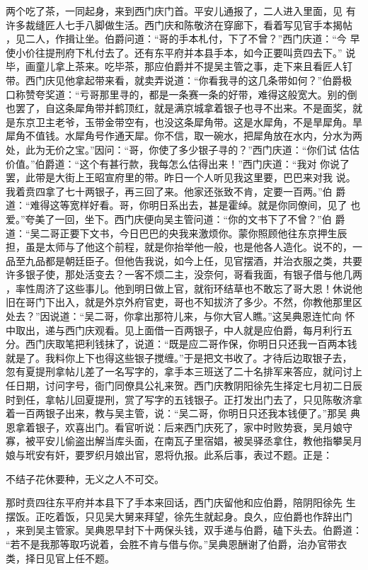 两个吃了茶，一同起身，来到西门庆门首。平安儿通报了，二人进入里面，见
有许多裁缝匠人七手八脚做生活。西门庆和陈敬济在穿廊下，看着写见官手本揭帖
，见二人，作揖让坐。伯爵问道：“哥的手本札付，下了不曾？”西门庆道：“今
早使小价往提刑府下札付去了。还有东平府并本县手本，如今正要叫贲四去下。”
说毕，画童儿拿上茶来。吃毕茶，那应伯爵并不提吴主管之事，走下来且看匠人钉
带。西门庆见他拿起带来看，就卖弄说道：“你看我寻的这几条带如何？”伯爵极
口称赞夸奖道：“亏哥那里寻的，都是一条赛一条的好带，难得这般宽大。别的倒
也罢了，自这条犀角带并鹤顶红，就是满京城拿着银子也寻不出来。不是面奖，就
是东京卫主老爷，玉带金带空有，也没这条犀角带。这是水犀角，不是旱犀角。旱
犀角不值钱。水犀角号作通天犀。你不信，取一碗水，把犀角放在水内，分水为两
处，此为无价之宝。”因问：“哥，你使了多少银子寻的？”西门庆道：“你们试
估估价值。”伯爵道：“这个有甚行款，我每怎么估得出来！”西门庆道：“我对
你说了罢，此带是大街上王昭宣府里的带。昨日一个人听见我这里要，巴巴来对我
说。我着贲四拿了七十两银子，再三回了来。他家还张致不肯，定要一百两。”伯
爵道：“难得这等宽样好看。哥，你明日系出去，甚是霍绰。就是你同僚间，见了
也爱。”夸美了一回，坐下。西门庆便向吴主管问道：“你的文书下了不曾？”伯
爵道：“吴二哥正要下文书，今日巴巴的央我来激烦你。蒙你照顾他往东京押生辰
担，虽是太师与了他这个前程，就是你抬举他一般，也是他各人造化。说不的，一
品至九品都是朝廷臣子。但他告我说，如今上任，见官摆酒，并治衣服之类，共要
许多银子使，那处活变去？一客不烦二主，没奈何，哥看我面，有银子借与他几两
，率性周济了这些事儿。他到明日做上官，就衔环结草也不敢忘了哥大恩！休说他
旧在哥门下出入，就是外京外府官吏，哥也不知拔济了多少。不然，你教他那里区
处去？”因说道：“吴二哥，你拿出那符儿来，与你大官人瞧。”这吴典恩连忙向
怀中取出，递与西门庆观看。见上面借一百两银子，中人就是应伯爵，每月利行五
分。西门庆取笔把利钱抹了，说道：“既是应二哥作保，你明日只还我一百两本钱
就是了。我料你上下也得这些银子搅缠。”于是把文书收了。才待后边取银子去，
忽有夏提刑拿帖儿差了一名写字的，拿手本三班送了二十名排军来答应，就问讨上
任日期，讨问字号，衙门同僚具公礼来贺。西门庆教阴阳徐先生择定七月初二日辰
时到任，拿帖儿回夏提刑，赏了写字的五钱银子。正打发出门去了，只见陈敬济拿
着一百两银子出来，教与吴主管，说：“吴二哥，你明日只还我本钱便了。”那吴
典恩拿着银子，欢喜出门。看官听说：后来西门庆死了，家中时败势衰，吴月娘守
寡，被平安儿偷盗出解当库头面，在南瓦子里宿娼，被吴驿丞拿住，教他指攀吴月
娘与玳安有奸，要罗织月娘出官，恩将仇报。此系后事，表过不题。正是：

不结子花休要种，无义之人不可交。

那时贲四往东平府并本县下了手本来回话，西门庆留他和应伯爵，陪阴阳徐先
生摆饭。正吃着饭，只见吴大舅来拜望，徐先生就起身。良久，应伯爵也作辞出门
，来到吴主管家。吴典恩早封下十两保头钱，双手递与伯爵，磕下头去。伯爵道：
“若不是我那等取巧说着，会胜不肯与借与你。”吴典恩酬谢了伯爵，治办官带衣
类，择日见官上任不题。

